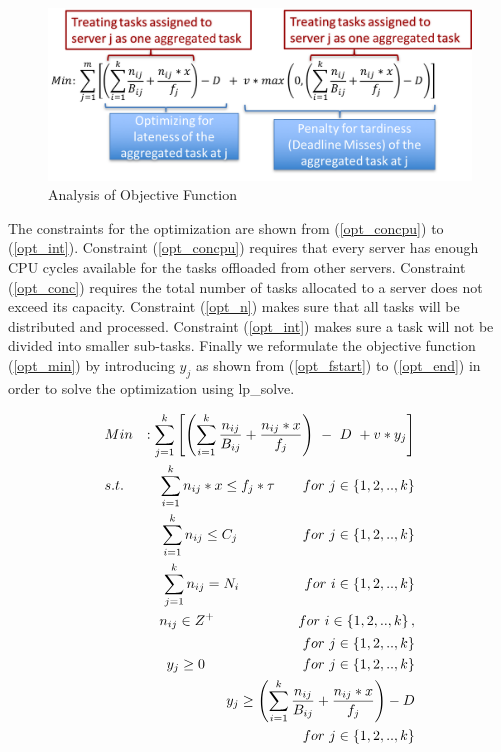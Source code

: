 \begin{figure}[ht!]
\centering
\includegraphics[width=1\linewidth]{images/opt_ill}
\caption{Analysis of Objective Function}
\label{opt_ill}
\end{figure}
\normalsize

The constraints for the optimization are shown from (\ref{opt_concpu}) to (\ref{opt_int}). Constraint (\ref{opt_concpu}) requires that every server has enough CPU cycles available for the tasks offloaded from other servers. Constraint (\ref{opt_conc}) requires the total number of tasks allocated to a server does not exceed its capacity. Constraint (\ref{opt_n}) makes sure that all tasks will be distributed and processed. Constraint (\ref{opt_int}) makes sure a task will not be divided into smaller sub-tasks. Finally we reformulate the objective function (\ref{opt_min}) by introducing $y_{j}$ as shown from (\ref{opt_fstart}) to (\ref{opt_end}) in order to solve the optimization using lp\_solve\cite{lpsolve}.



\setlength{\arraycolsep}{0.0em}
\begin{eqnarray}
\small
\label{opt_fstart}
&Min&: \sum_{j=1}^{k}\left [\left (\sum\limits_{i=1}^{k} \frac{n_{ij}}{B_{ij}}+\frac{n_{ij}*x}{f_{j}} \right ) \ - \ D \ + v * y_{j} \right ]\\
\label{opt_concpu2}
&s.t.& \sum_{i=1}^{k} n_{ij}*x\leq f_{j}*\tau  \qquad for \ j\in \left \{ 1,2,..,k \right \}\\
\label{opt_conc2}
&\phantom{s.t.}& \sum_{i=1}^{k} n_{ij}\leq C_{j} \ \ \qquad\quad\quad for \ j\in \left \{ 1,2,..,k \right \}\\
\label{opt_n2}
&\phantom{s.t.}& \sum_{j=1}^{k} n_{ij}=N_{i} \  \ \qquad \quad \quad for \ i\in \left \{ 1,2,..,k \right \} \\
\label{opt_int2}
&\phantom{s.t.}&  n_{ij}\in Z^{+} \qquad \qquad \qquad  for \ i\in \left \{ 1,2,..,k \right \} ,\nonumber\\
&\phantom{s.t.}& \phantom{n_{ij}\in Z^{+}}  \qquad \qquad \qquad for \ j\in \left \{ 1,2,..,k \right \}\\
\label{opt_y}
&\phantom{s.t.}& y_{j}\geq 0 \ \ \ \qquad\qquad\qquad for \ j\in \left \{ 1,2,..,k \right \}\\
\label{opt_end}
&\phantom{s.t.}& y_{j}\geq \left (\sum\limits_{i=1}^{k} \frac{n_{ij}}{B_{ij}}+\frac{n_{ij}*x}{f_{j}} \right )-D \nonumber\\ 
&\phantom{s.t.}&\qquad\qquad\qquad\qquad\qquad for \ j\in \left \{ 1,2,..,k \right \}
\end{eqnarray}
\setlength{\arraycolsep}{5pt}
\normalsize
